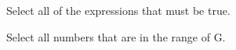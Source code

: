 \documentclass{ximera}
\begin{document}
\begin{exercise}
Select all of the expressions that must be true. 

\begin{selectAll}
\end{selectAll}

\end{exercise}





\begin{exercise}
Select all numbers that are in the range of G.

\begin{selectAll}
\end{selectAll}

\end{exercise}
\end{document}
